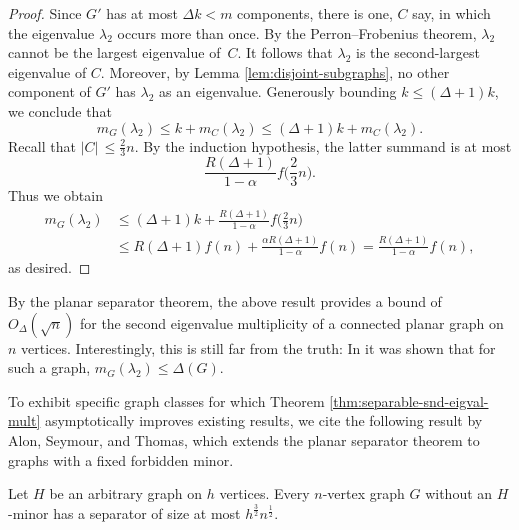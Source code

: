 \begin{proof}
    Since $G'$ has at most $\Delta k < m$ components, there is one, $C$ say, in which the eigenvalue $\lambda_2$ occurs more than once.
    By the Perron--Frobenius theorem, $\lambda_2$ cannot be the largest eigenvalue \mbox{of $C$}. 
    It follows that $\lambda_2$ is the second-largest eigenvalue of $C$.
    Moreover, by Lemma \ref{lem:disjoint-subgraphs}, no other component of $G'$ has $\lambda_2$ as an eigenvalue.
    Generously bounding $k \le (\Delta + 1)k$, we conclude that
    \begin{equation*}
        m_G(\lambda_2) \le k + m_C(\lambda_2) \le (\Delta + 1) k + m_C (\lambda_2).
    \end{equation*}
    Recall that $|C|\, \le \frac{2}{3}n$. 
    By the induction hypothesis, the latter summand is at most 
    \begin{equation*}
         \frac{R(\Delta + 1)}{1 - \alpha} f \Big( \frac{2}{3}n \Big).
    \end{equation*}
    Thus we obtain 
    \begin{align*}
        m_G( \lambda_2 ) &\le (\Delta + 1)k + \frac{R(\Delta + 1)}{1 - \alpha} f \Big( \frac{2}{3}n \Big) \\ 
        &\le R(\Delta + 1) f(n) + \frac{\alpha R (\Delta + 1)}{1 - \alpha} f(n) = \frac{R (\Delta + 1)}{1 - \alpha} f(n),
    \end{align*}
    as desired.
\end{proof}

\begin{remark}
    By the planar separator theorem, the above result provides a bound of $O_\Delta (\sqrt{n})$ for the second eigenvalue multiplicity of a connected planar graph on $n$ vertices.
    Interestingly, this is still far from the truth: In \cite{planarmultiplicty} it was shown that for such a graph, $m_G(\lambda_2) \le \Delta(G)$.
\end{remark}

To exhibit specific graph classes for which Theorem \ref{thm:separable-snd-eigval-mult} asymptotically improves existing results, we cite the following result by Alon, Seymour, and Thomas, which extends the planar separator theorem to graphs with a fixed forbidden minor.
\begin{theorem}
    Let $H$ be an arbitrary graph on $h$ vertices. 
    Every $n$-vertex graph $G$ without an $H$-minor has a separator of size at most $h^{\frac{3}{2}} n^{\frac{1}{2}}$.
\end{theorem}

